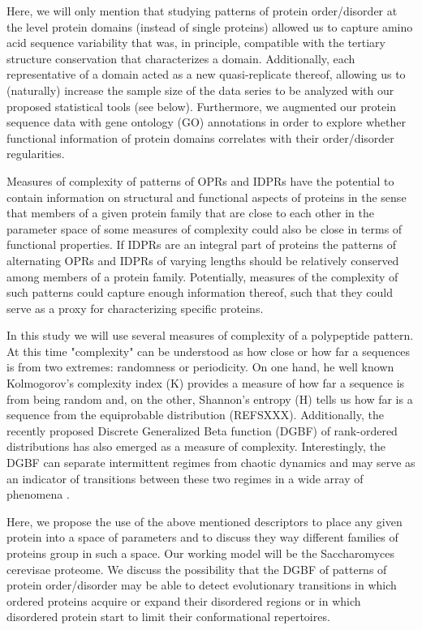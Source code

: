 \documentclass[preprint,12pt]{elsarticle}
\begin{document}
Here, we will only mention that studying patterns of protein order/disorder at the level protein domains (instead of single proteins) allowed us to capture amino acid sequence variability that was, in principle, compatible with the tertiary structure conservation that characterizes a domain. Additionally, each representative of a domain acted as a new quasi-replicate thereof, allowing us to (naturally) increase the sample size of the data series to be analyzed with our proposed statistical tools (see below). Furthermore, we augmented our protein sequence data with gene ontology (GO) annotations in order to explore whether functional information of protein domains correlates with their order/disorder regularities. 

Measures of complexity of patterns of OPRs and IDPRs have the potential to contain information on structural and functional aspects of proteins in the sense that members of a given protein family that are close to each other in the parameter space of some measures of complexity could also be close in terms of functional properties. If IDPRs are an integral part of proteins the patterns of alternating OPRs and IDPRs of varying lengths should be relatively conserved among members of a protein family. Potentially, measures of the complexity of such patterns could capture enough information thereof, such that they could serve as a proxy for characterizing specific proteins.

In this study we will use several measures of complexity of a polypeptide pattern. At this time "complexity" can be understood as how close or how far a sequences is from two extremes: randomness or periodicity. On one hand, he well known Kolmogorov’s complexity index (K) provides a measure of how far a sequence is from being random and, on the other,  Shannon’s entropy (H) tells us how far is a sequence from the equiprobable distribution (REFSXXX). Additionally, the recently proposed Discrete Generalized Beta function (DGBF)  of rank-ordered distributions has also emerged as a measure of complexity. Interestingly, the DGBF can separate intermittent regimes from chaotic dynamics and may serve as an indicator of transitions between these two regimes in a wide array of phenomena \cite{martinez2009universality}.

Here, we propose  the use of the above mentioned descriptors to place any given protein into a space of parameters and to discuss they way different families of proteins group in such a space. Our working model will be the Saccharomyces cerevisae proteome. We discuss the possibility that the DGBF of patterns of protein order/disorder may be able to detect evolutionary transitions in which ordered proteins acquire or expand their disordered regions or in which disordered protein start to limit their conformational repertoires. 
\end{document}
